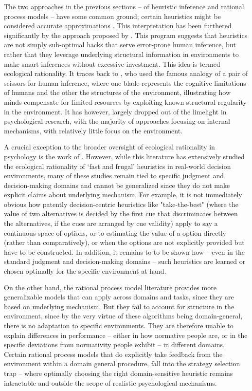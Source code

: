The two approaches in the previous sections -- of heuristic inference and rational process models -- have some common ground; certain heuristics might be considered accurate approximations \citep{gigerenzer2009homo, parpart2018heuristics, belousov2016catching}. This interpretation has been furthered significantly by the approach proposed by \citet{gigerenzer2011heuristic}. This program suggests that heuristics are not simply sub-optimal hacks that serve error-prone human inference, but rather that they leverage underlying structural information in environments to make smart inferences without excessive investment. This idea is termed ecological rationality. It traces back to \citet{simon1955behavioral}, who used the famous analogy of a pair of scissors for human inference, where one blade represents the cognitive limitations of humans and the other the structures of the environment, illustrating how minds compensate for limited resources by exploiting known structural regularity in the environment. It has however, largely dropped out of the limelight in psychological research, with the majority of approaches focusing on internal mechanisms, with relatively little focus on the environment.

A crucial exception to the broader oversight of ecological rationality in psychology is the work of \citep{gigerenzer2008heuristics}. However, while this literature has extensively studied the ecological rationality of `fast and frugal' heuristics in real-world decision environments, many of these studies remain tied to specific judgment and decision-making domains and cannot be generalized since they do not make explicit claims about underlying mechanism. For example, it is not immediately obvious how patently decision-centric heuristics like "take-the-best" (where the value of two alternatives is decided by the first cue that discriminates between the alternatives, if the cues are arranged by cue validity) apply to say a continuous space of options, or to estimating the value of a option directly (rather than comparatively), or when the options are not explicitly provided but have to be constructed. In addition, it remains to to be shown how -- even in the standard judgment and decision-making domains -- such heuristics are learned or chosen optimally for the specific environment at hand. 

On the other hand, the rational process model literature provides more generalizable models that can apply across domains and tasks, since they are based on underlying mechanism. But they fail to account for structure in the environment, since by the very virtue of these algorithms being domain-general, there is no adaptation to specific environments. They are therefore unable to explain differences in performance -- either in how normative people are, or in the specific deviations from normativity people exhibit -- in different domains. Certain rational process models that do explicitly take feedback from the environment within a domain general procedure, fall into the strategy selection trap -- where optimally choosing the right domain-sensitive heuristic remains intractable and outside the scope of realistic psychological mechanisms.

